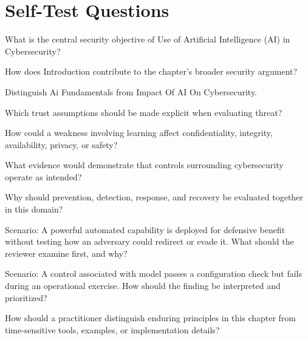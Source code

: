 \documentclass[11pt,letterpaper]{article}
\begin{document}
\section*{Self-Test Questions}
\begin{CornellRecallList}
\item What is the central security objective of Use of Artificial Intelligence (AI) in Cybersecurity?
\item How does Introduction contribute to the chapter's broader security argument?
\item Distinguish Ai Fundamentals from Impact Of AI On Cybersecurity.
\item Which trust assumptions should be made explicit when evaluating threat?
\item How could a weakness involving learning affect confidentiality, integrity, availability, privacy, or safety?
\item What evidence would demonstrate that controls surrounding cybersecurity operate as intended?
\item Why should prevention, detection, response, and recovery be evaluated together in this domain?
\item Scenario: A powerful automated capability is deployed for defensive benefit without testing how an adversary could redirect or evade it. What should the reviewer examine first, and why?
\item Scenario: A control associated with model passes a configuration check but fails during an operational exercise. How should the finding be interpreted and prioritized?
\item How should a practitioner distinguish enduring principles in this chapter from time-sensitive tools, examples, or implementation details?
\end{CornellRecallList}
\end{document}
